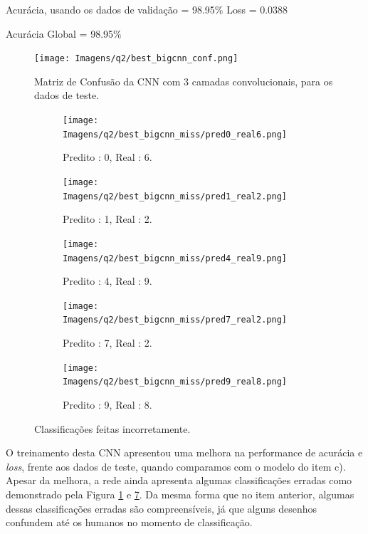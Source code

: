 \documentclass[12pt]{article}
\begin{document}
\begin{center}
	Acurácia, usando os dados de validação = 98.95\% \hspace{100px} Loss  = 0.0388 
\end{center}

\begin{center}
	Acurácia Global = 98.95\% 
\end{center}

\begin{figure}[H]
	\centering
	\texttt{[image: Imagens/q2/best\_bigcnn\_conf.png]}
	\caption{Matriz de Confusão da CNN com 3 camadas convolucionais, para os dados de teste.}
	\label{fig:best_bigcnn_conf}
\end{figure}

\begin{figure}[H]
	\centering
	\begin{subfigure}{0.25\linewidth}
		\centering
		\texttt{[image: Imagens/q2/best\_bigcnn\_miss/pred0\_real6.png]}
		\caption{Predito : 0, Real : 6.}
		\label{fig:pred0_real6_2}
	\end{subfigure}
	\hfill
	\begin{subfigure}{0.25\linewidth}
		\centering
		\texttt{[image: Imagens/q2/best\_bigcnn\_miss/pred1\_real2.png]}
		\caption{Predito : 1, Real : 2.}
		\label{fig:pred1_real2}
	\end{subfigure}
	\hfill
	\begin{subfigure}{0.25\linewidth}
		\centering
		\texttt{[image: Imagens/q2/best\_bigcnn\_miss/pred4\_real9.png]}
		\caption{Predito : 4, Real : 9.}
		\label{fig:pred4_real9}
	\end{subfigure}
	
	\begin{subfigure}{0.25\linewidth}
		\centering
		\texttt{[image: Imagens/q2/best\_bigcnn\_miss/pred7\_real2.png]}
		\caption{Predito : 7, Real : 2.}
		\label{fig:pred7_real2_2}
	\end{subfigure}
	\hspace{70px}
	\begin{subfigure}{0.25\linewidth}
		\centering
		\texttt{[image: Imagens/q2/best\_bigcnn\_miss/pred9\_real8.png]}
		\caption{Predito : 9, Real : 8.}
		\label{fig:pred9_real8}
	\end{subfigure}
	\caption{Classificações feitas incorretamente.}
	\label{fig:miss_2}
\end{figure}

O treinamento desta CNN apresentou uma melhora na performance de acurácia e \textit{loss}, frente aos dados de teste, quando comparamos com o modelo do item c). Apesar da melhora, a rede ainda apresenta algumas classificações erradas como demonstrado pela Figura \ref{fig:best_bigcnn_conf} e \ref{fig:miss_2}. Da mesma forma que no item anterior, algumas dessas classificações erradas são compreensíveis, já que alguns desenhos confundem até os humanos no momento de classificação.
\end{document}
